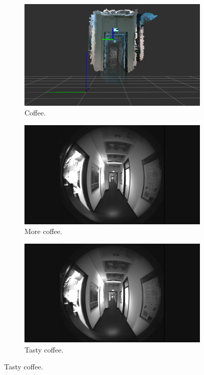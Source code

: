 \begin{figure}[h!]
	\centering
	\begin{subfigure}[b]{0.31\linewidth}
		\includegraphics[width=\linewidth]{images/dataset/pointcloud2.png}
		\caption{Coffee.}
	\end{subfigure}
	\begin{subfigure}[b]{0.31\linewidth}
		\includegraphics[width=\linewidth]{images/dataset/f1_frame000005.png}
		\caption{More coffee.}
	\end{subfigure}
	\begin{subfigure}[b]{0.31\linewidth}
		\includegraphics[width=\linewidth]{images/dataset/f2_frame000005.png}
		\caption{Tasty coffee.}
	\end{subfigure}


\end{figure}
